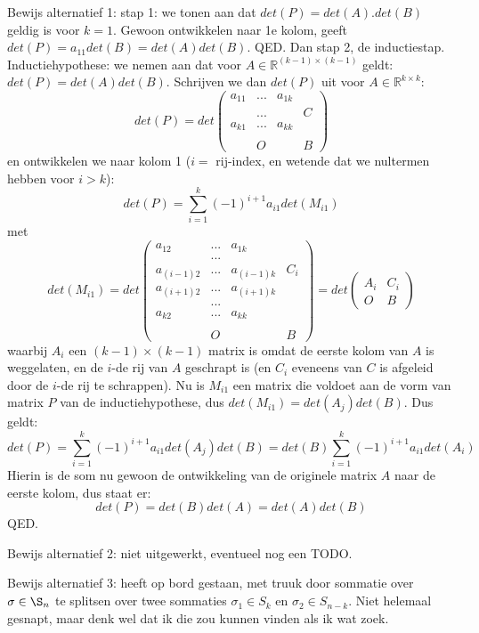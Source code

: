 \documentclass{article}
\begin{document}
Bewijs alternatief 1: stap 1: we tonen aan dat $det(P)=det(A).det(B)$ geldig is voor $k=1$. Gewoon ontwikkelen naar 1e kolom, geeft $det(P)=a_{11}det(B)= det(A)det(B)$. QED. 
Dan stap 2, de inductiestap. Inductiehypothese: we nemen aan dat voor $A \in \mathbb{R}^{(k-1)\times (k-1)}$ geldt: $det(P) = det(A)det(B)$. Schrijven we dan $det(P)$ uit voor $A \in \mathbb{R}^{k\times k}$: 
\[ det(P) = det 
\begin{pmatrix}
a_{11} & ... & a_{1k}  &  \\
       & ... &   &  C \\
a_{k1} & ... & a_{kk}  & \\
       &   &         &   \\ 
       & O   &         & B 
\end{pmatrix} \]  
en ontwikkelen we naar kolom 1 ($i = $ rij-index, en wetende dat we nultermen hebben voor $i > k$):  
\[ det(P) = \sum_{i=1}^k (-1)^{i+1} a_{i1} det(M_{i1})  \]
met 
\[ det(M_{i1}) = det \begin{pmatrix}
a_{12} & ... & a_{1k}  &  \\
       & ... &   &   \\
a_{(i-1)2} & ... & a_{(i-1)k}  & C_i\\
a_{(i+1)2} & ... & a_{(i+1)k}  & \\
       & ... &   &   \\
a_{k2} & ... & a_{kk}  & \\
       &   &         &   \\ 
       & O   &         & B 
\end{pmatrix} = det \begin{pmatrix}
A_i  &  C_i \\
 O   &  B 
\end{pmatrix} \]
waarbij $A_i$ een $(k-1) \times (k-1)$ matrix is omdat de eerste kolom van $A$ is weggelaten, en de $i$-de rij van $A$ geschrapt is (en $C_i$ eveneens van $C$ is afgeleid door de $i$-de rij te schrappen). 
Nu is $M_{i1}$ een matrix die voldoet aan de vorm van matrix $P$ van de inductiehypothese, dus $det(M_{i1}) = det(A_j) det(B) $. Dus geldt: 
\[ det(P) = \sum_{i=1}^k (-1)^{i+1} a_{i1} det(A_j) det(B) =  det(B) \sum_{i=1}^k (-1)^{i+1} a_{i1} det(A_i) \]
Hierin is de som nu gewoon de ontwikkeling van de originele matrix $A$ naar de eerste kolom, dus staat er: 
\[ det(P) = det(B)det(A) = det(A)det(B)\]
QED. 

Bewijs alternatief 2: niet uitgewerkt, eventueel nog een TODO. 

Bewijs alternatief 3: heeft op bord gestaan, met truuk door sommatie over $\sigma \in \S_n$ te splitsen over twee sommaties $\sigma_1 \in S_k$ en $\sigma_2 \in S_{n-k}$. Niet helemaal gesnapt, maar denk wel dat ik die zou kunnen vinden als ik wat zoek. 
\end{document}
